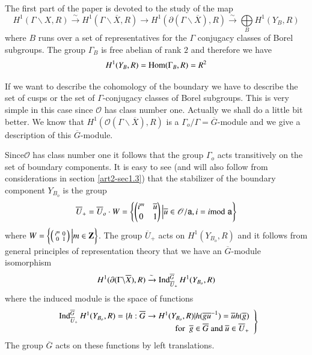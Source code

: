 The first part of the paper is devoted to the study of the map
$$
H^{1}(\Gamma\backslash X,R)\xrightarrow{\sim}H^{1}(\Gamma\backslash \overline{X},R)\to H^{1}(\partial (\Gamma\backslash \overline{X}),R)\xrightarrow{\sim}\bigoplus\limits_{B}H^{1}(Y_{B},R)
$$
where $B$ runs over a set of representatives for the $\Gamma$ conjugacy classes of Borel subgroups. The group $\Gamma_{B}$ is free abelian of rank $2$ and therefore we have
$$
H^{1}(Y_{B},R)=\operatorname{Hom} (\Gamma_{B},R)=R^{2}
$$

If we want to describe the cohomology of the boundary we have to describe the set of cusps or the set of $\Gamma$-conjugacy classes of Borel subgroups. This is very simple in this case since $\mathscr{O}$ has class number one. Actually we shall do a little bit better. We know that $H^{1}(\mathscr{O}(\Gamma\backslash \overline{X}), R)$ is a $\Gamma_{o}/\Gamma=\overline{G}$-module and we give a description of this $\overline{G}$-module.

Since\pageoriginale $\mathscr{O}$ has class number one it follows that the group $\Gamma_{o}$ acts transitively on the set of boundary components. It is easy to see (and will also follow from considerations in section \ref{art2-sec1.3}) that the stabilizer of the boundary component $Y_{B_{o}}$ is the group
$$
\overline{U}_{+}=\overline{U}_{o}\cdot W=\left\{\left(\begin{matrix} i^{m} & \overline{u}\\ 0 & 1\end{matrix}\right) \Big| \overline{u}\in \mathscr{O}/\mathsf{a}, i=i{\rm{mod}}\kern.3em \mathsf{a}\right\}
$$
where $W=\left\{\left(\begin{smallmatrix} i^{m} & 0\\ 0 & 1\end{smallmatrix}\right)\Big| m\in \mathbf{Z}\right\}$. The group $\overline{U}_{+}$ acts on $H^{1}(Y_{B_{o}},R)$ and it follows from general principles of representation theory that we have an $\overline{G}$-module isomorphism
$$
H^{1}(\partial (\Gamma\backslash \overline{X}), R)\xrightarrow{\sim}\operatorname{Ind}^{\overline{G}}_{\overline{U}_{+}}H^{1}(Y_{B_{o}},R)
$$
where the induced module is the space of functions
$$
\left.
\begin{array}{r}
\operatorname{Ind}^{\overline{G}}_{\overline{U}_{+}}H^{1}(Y_{B_{o}},R)=\{h:\overline{G}\to H^{1}(Y_{B_{o}},R)|h(\overline{g}\overline{u}^{-1})=\overline{u}h(\overline{g})\\
\text{for~ } \overline{g}\in \overline{G}\text{~and~} \overline{u}\in\overline{U}_{+}
\end{array}
\right\}
$$
The group $\overline{G}$ acts on these functions by left translations.

